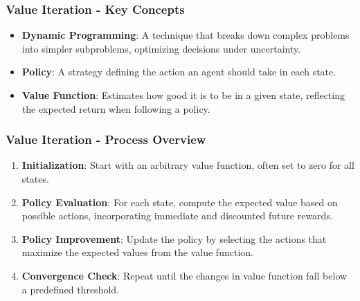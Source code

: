 \documentclass{beamer}
\begin{document}
\begin{frame}[fragile]
    \frametitle{Value Iteration - Key Concepts}
    \begin{itemize}
        \item \textbf{Dynamic Programming}: 
        A technique that breaks down complex problems into simpler subproblems, optimizing decisions under uncertainty.
        
        \item \textbf{Policy}: 
        A strategy defining the action an agent should take in each state.
        
        \item \textbf{Value Function}: 
        Estimates how good it is to be in a given state, reflecting the expected return when following a policy.
    \end{itemize}
\end{frame}

\begin{frame}[fragile]
    \frametitle{Value Iteration - Process Overview}
    \begin{enumerate}
        \item \textbf{Initialization}: 
        Start with an arbitrary value function, often set to zero for all states.
        
        \item \textbf{Policy Evaluation}: 
        For each state, compute the expected value based on possible actions, incorporating immediate and discounted future rewards.

        \item \textbf{Policy Improvement}: 
        Update the policy by selecting the actions that maximize the expected values from the value function.

        \item \textbf{Convergence Check}: 
        Repeat until the changes in value function fall below a predefined threshold.
    \end{enumerate}
\end{frame}
\end{document}
